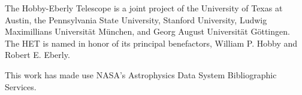\documentclass{emulateapj}
\begin{document}
\begin{CJK*}{UTF8}{gbsn}
The Hobby-Eberly Telescope is a joint project of the University of
Texas at Austin, the Pennsylvania State University, Stanford
University, Ludwig Maximillians Universit\"at M\"unchen, and Georg
August Universit\"at G\"ottingen. The HET is named in honor of its
principal benefactors, William P. Hobby and Robert E. Eberly.

This work has made use NASA’s Astrophysics Data System Bibliographic Services.


\end{CJK*}


\end{document}
